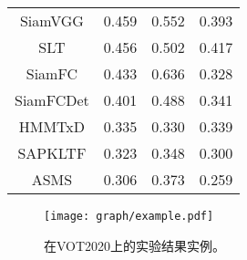 \documentclass[promaster]{thesis-uestc}
\begin{document}
\begin{table}[htbp!]
\begin{center}
\begin{tabular}{cccc}
    SiamVGG          & 0.459                                 & 0.552                                 & 0.393                             \\
    SLT                    & 0.456                                 & 0.502                                 & 0.417                             \\
    SiamFC              & 0.433                                 &  0.636 & 0.328  \\
    SiamFCDet        & 0.401                                 & 0.488                                 & 0.341                              \\
    HMMTxD         & 0.335                                 & 0.330                                 & 0.339                               \\
    SAPKLTF          & 0.323                                 & 0.348                                 & 0.300                               \\
    ASMS                & 0.306                                 & 0.373                                 & 0.259                               \\
    \hline
    \end{tabular}
    \end{center}
    \vspace{-5mm}
\end{table}


\begin{figure*}[htp!]
	\centering  
	\texttt{[image: graph/example.pdf]}
    \caption{在VOT2020上的实验结果实例。}
	\label{fig:example}
\end{figure*}
\end{document}
